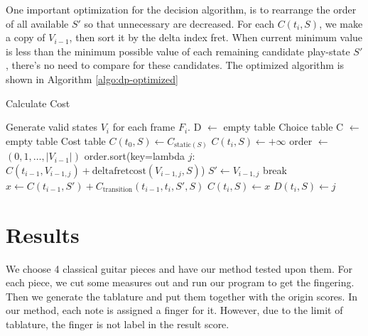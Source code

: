 One important optimization for the decision algorithm, is to rearrange the order of all available $S'$ so that unnecessary are decreased. For each $C(t_i, S)$, we make a copy of $V_{i-1}$, then sort it by the delta index fret. When current minimum value is less than the minimum possible value of each remaining candidate play-state $S'$, there's no need to compare for these candidates. The optimized algorithm is shown in Algorithm \ref{algo:dp-optimized}

\begin{algorithm}
    \caption{Calculate Cost} \label{algo:dp-optimized}
    \begin{algorithmic}

        \State {}
        \State Generate valid states $V_i$ for each frame $F_i$.
        \State D $\gets$ empty table \Comment Choice table
        \State C $\gets$ empty table \Comment Cost table
            \State $C(t_0, S) \gets C_{\mathrm{static}(S)}$
        \EndFor
                \State $C(t_i, S) \gets +\infty$
                \State order $\gets$ $\left( 0, 1, \ldots, |V_{i-1}| \right)$
                \State order.sort(key=lambda $j$: $C(t_{i-1}, V_{i-1, j})
                        + \mathrm{delta fret cost}(V_{i-1, j}, S)$)
                    \State $S' \gets V_{i-1, j}$
                        \State break
                    \EndIf
                    \State $x \gets C(t_{i-1}, S') + 
                            C_{\mathrm{transition}}(t_{i-1}, t_i, S', S)$
                        \State $C(t_i, S) \gets x$
                        \State $D(t_i, S) \gets j$
                    \EndIf
                \EndFor
            \EndFor
        \EndFor
    \EndProcedure
    \end{algorithmic}
\end{algorithm}


\section{Results}

We choose 4 classical guitar pieces and have our method tested upon them. For each piece, we cut 
some measures out and run our program to get the fingering. Then we generate the tablature and put them together with the origin scores. In our method, each note is assigned a finger for it. However, due to the limit of tablature, the finger is not label in the result score. 

